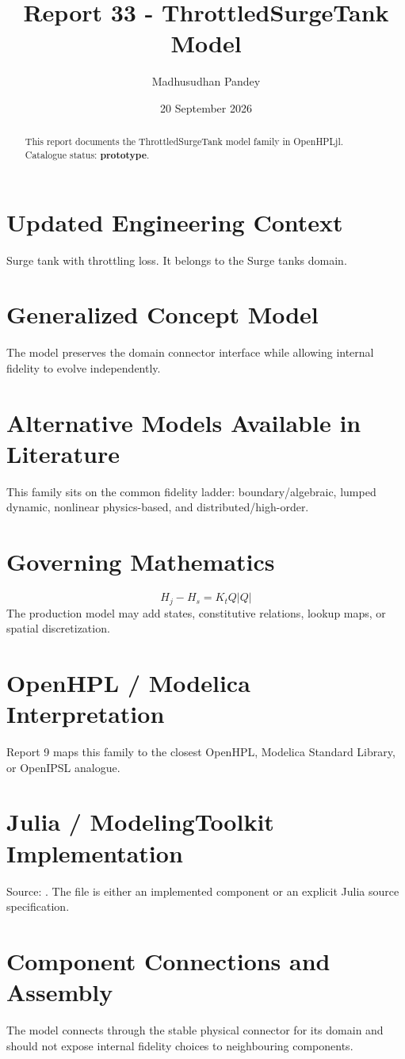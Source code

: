 \documentclass[10pt,a4paper]{article}
\title{Report 33 - ThrottledSurgeTank Model}
\author{Madhusudhan Pandey}
\date{20 September 2026}
\begin{document}
\maketitle
\begin{abstract}This report documents the ThrottledSurgeTank model family in OpenHPLjl. Catalogue status: \textbf{prototype}.\end{abstract}
\section{Updated Engineering Context}Surge tank with throttling loss. It belongs to the Surge tanks domain.
\section{Generalized Concept Model}The model preserves the domain connector interface while allowing internal fidelity to evolve independently.
\section{Alternative Models Available in Literature}This family sits on the common fidelity ladder: boundary/algebraic, lumped dynamic, nonlinear physics-based, and distributed/high-order.
\section{Governing Mathematics}\[H_j-H_s=K_t Q|Q|\]The production model may add states, constitutive relations, lookup maps, or spatial discretization.
\section{OpenHPL / Modelica Interpretation}Report 9 maps this family to the closest OpenHPL, Modelica Standard Library, or OpenIPSL analogue.
\section{Julia / ModelingToolkit Implementation}Source: \texttt{}. The file is either an implemented component or an explicit Julia source specification.
\section{Component Connections and Assembly}The model connects through the stable physical connector for its domain and should not expose internal fidelity choices to neighbouring components.
\end{document}
